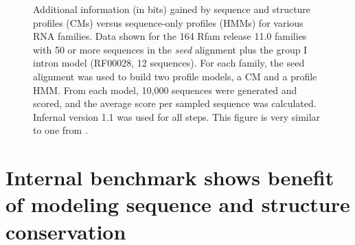 \documentclass[custom,landscape,final,30pt,plainboxedsections]{sciposter-titleskipsmall}
\begin{document}
\begin{multicols}{3}
\begin{footnotesize}
\begin{figure}
\caption{Additional information (in bits) gained by sequence and
  structure profiles (CMs) versus sequence-only profiles (HMMs) for
  various RNA families.  
  Data shown for the 164 Rfam release 11.0 families
  with 50 or more sequences in the \emph{seed} alignment plus the group I
  intron model (RF00028, 12 sequences). For each
  family, the seed alignment was used to build two profile models, a
  CM and a profile HMM. From each model, 10,000 sequences were
  generated and scored, and the average score per sampled sequence was
  calculated. Infernal version 1.1 was used for all steps. This figure
  is very similar to one from \cite{Nawrocki13b}.
}
\label{fig:avgscores}
\end{figure}
\end{footnotesize}


\columnbreak

\section*{Internal benchmark shows benefit of modeling sequence and
  structure conservation}


\end{multicols}
\end{document}
